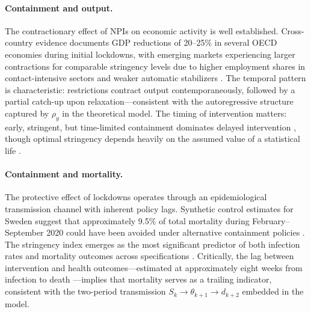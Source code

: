 \paragraph{Containment and output.} The contractionary effect of NPIs on
economic activity is well established. Cross-country evidence documents GDP
reductions of 20--25\% in several OECD economies during initial lockdowns,
with emerging markets experiencing larger contractions for comparable
stringency levels due to higher employment shares in contact-intensive
sectors and weaker automatic stabilizers \citep{imf2020, portes2020}. The
temporal pattern is characteristic: restrictions contract output
contemporaneously, followed by a partial catch-up upon relaxation---consistent
with the autoregressive structure captured by $\rho_y$ in the theoretical
model. The timing of intervention matters: early, stringent, but time-limited
containment dominates delayed intervention \citep{acemoglu2021, alvarez2021,
balmford2020, kargi2023}, though optimal stringency depends heavily on the
assumed value of a statistical life \citep{alvarez2021}.

\paragraph{Containment and mortality.} The protective effect of lockdowns
operates through an epidemiological transmission channel with inherent policy
lags. Synthetic control estimates for Sweden suggest that approximately 9.5\%
of total mortality during February--September 2020 could have been avoided
under alternative containment policies \citep{born2021}. The stringency index
emerges as the most significant predictor of both infection rates and
mortality outcomes across specifications \citep{kargi2023}. Critically, the
lag between intervention and health outcomes---estimated at approximately
eight weeks from infection to death \citep{gagnon2023}---implies that
mortality serves as a trailing indicator, consistent with the two-period
transmission $S_k \to \theta_{k+1} \to d_{k+2}$ embedded in the model.

